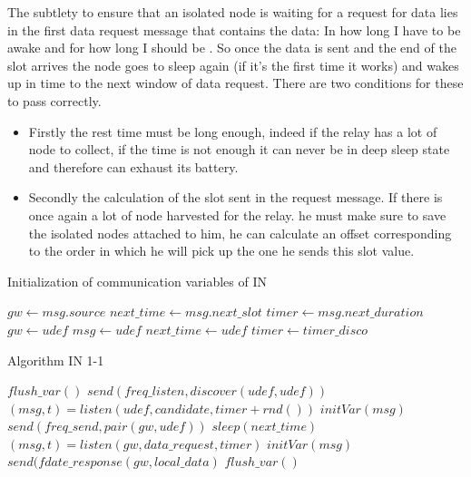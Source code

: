 \documentclass[conference]{IEEEtran}
\begin{document}
The subtlety to ensure that an isolated node is waiting for a request for data lies in the first data request message that contains the data: In how long I have to be awake and for how long I should be .
So once the data is sent and the end of the slot arrives the node goes to sleep again (if it's the first time it works) and wakes up in time to the next window of data request. There are two conditions for these to pass correctly.
\begin {itemize}
\item Firstly the rest time must be long enough, indeed if the relay has a lot of node to collect, if the time is not enough it can never be in deep sleep state and therefore can exhaust its battery.
\item Secondly the calculation of the slot sent in the request message. If there is once again a lot of node harvested for the relay. he must make sure to save the isolated nodes attached to him, he can calculate an offset corresponding to the order in which he will pick up the one he sends this slot value.
\end {itemize}
\begin{algorithm}[!h]
\caption{Initialization of communication variables of IN}\label{alg:intvar}
\begin{algorithmic}[1]
\State $gw \leftarrow msg.source$
\State $next\_time \leftarrow msg.next\_slot$
\State $timer \leftarrow msg.next\_duration$
\EndProcedure
\State
{}
\State $gw \leftarrow udef$
\State $msg \leftarrow udef$
\State $next\_time \leftarrow udef$
\State $timer \leftarrow timer\_disco$
\EndProcedure
\end{algorithmic}
\end{algorithm}
\begin{algorithm}
\caption{Algorithm IN 1-1}\label{alg:in1-1}
\begin{algorithmic}[1]
  \State $flush\_var()$
    \State $send(freq\_listen,discover(udef,udef))$
    \State $(msg,t) = listen(udef,candidate,timer +rnd())$
  \EndWhile
  \State $initVar(msg)$
  \State $send(freq\_send,pair(gw,udef))$
  \State
    \State $sleep(next\_time)$
    \State $(msg,t) = listen(gw,data\_request,timer)$
      \State $initVar(msg)$
      \State $send(fdate\_response(gw,local\_data)$
    \Else
      $flush\_var()$
    \EndIf
  \EndWhile
\EndWhile
\end{algorithmic}
\end{algorithm}
\end{document}
